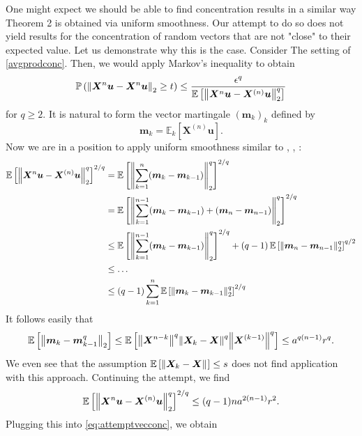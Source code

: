 One might expect we should be able to find concentration results in a similar way \cite{huang2020matrix} Theorem 2 is obtained via uniform smoothness. Our attempt to do so does not yield results for the concentration of random vectors that are not "close" to their expected value. Let us demonstrate why this is the case. 
Consider The setting of \ref{avgprodconc}. Then, we would apply Markov's inequality to obtain
\begin{equation} \mathbb{P}\left(\norm{\bm{X}^{n}\bm{u}-\bm{X}^{n}\bm{u}}_{2} \geq t\right)  \leq \frac{\epsilon^{q}}{\mathbb{E}\left[\norm{\bm{X}^{n}\bm{u}- \bm{X}^{(n)}\bm{u}}_{2}^{q}\right]}\label{eq:attemptvecconc}\end{equation}
for \( q \geq 2 \).
It is natural to form the vector martingale \( (\bm{m}_k)_k \) defined by 
\[ \bm{m}_k = \mathbb{E}_k\left[\bm{X}^{(n)}\bm{u}\right]. \]
Now we are in a position to apply uniform smoothness similar to \cite{chen2021product}, \cite{chen2021otoc}, \cite{huang2020matrix}:
\begin{align*}
  \mathbb{E}\left[\norm{\bm{X}^{n}\bm{u}- \bm{X}^{(n)}\bm{u}}_{2}^{q}\right]^{2/q} &= \mathbb{E}\left[\norm{ \sum_{k=1}^{n} (\bm{m}_k-\bm{m}_{k-1})}_{2}^{q}\right]^{2/q} \\
                                                                                   &= \mathbb{E}\left[\norm{ \sum_{k=1}^{n-1} (\bm{m}_k-\bm{m}_{k-1})+ (\bm{m}_n-\bm{m}_{n-1})}_{2}^{q}\right]^{2/q} \\
                                                                                   &\leq  \mathbb{E}\left[\norm{ \sum_{k=1}^{n-1} (\bm{m}_k-\bm{m}_{k-1})}_{2}^{q}\right]^{2/q} + \left(q-1\right) \mathbb{E}\left[ \norm{\bm{m}_n- \bm{m}_{n-1}}_{2}^{q}\right]^{q/2} \\
                                                                                   &\leq \dots \\
                                                                                   &\leq (q-1) \sum_{k=1}^{n} \mathbb{E}\left[\norm{\bm{m}_k-\bm{m}_{k-1}}_{2}^{q}\right]^{2/q}
\end{align*}
It follows easily that 
\[  \mathbb{E}\left[\norm{\bm{m}_k-\bm{m}_{k-1}^{q}}_{2}\right] \leq \mathbb{E}\left[\norm{\bm{X}^{n-k}}_{}^{q} \norm{\bm{X}_k-\bm{X}}_{}^{q} \norm{\bm{X}^{(k-1)}}_{}^{q}\right] \leq a^{q(n-1)}r^{q}.\]
We even see that the assumption \( \mathbb{E}\left[\norm{\bm{X}_k-\bm{X}}_{}\right] \leq s\) does not find application with this approach. Continuing the attempt, we find 
\[ \mathbb{E}\left[\norm{\bm{X}^{n}\bm{u}- \bm{X}^{(n)}\bm{u}}_{2}^{q}\right]^{2/q} \leq (q-1) na^{2(n-1)} r^{2}.\] Plugging this into \ref{eq:attemptvecconc}, we obtain
